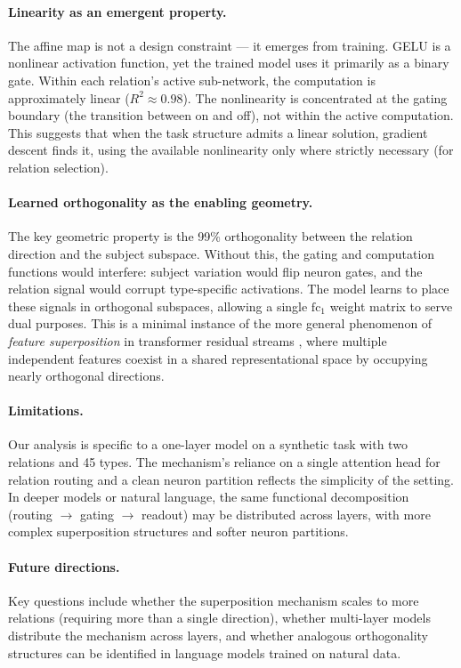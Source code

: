 \documentclass[11pt,a4paper]{article}
\newcommand{\fc}{\mathrm{fc}}
\begin{document}
\paragraph{Linearity as an emergent property.}
The affine map is not a design constraint --- it emerges from
training. GELU is a nonlinear activation function, yet the trained
model uses it primarily as a binary gate. Within each relation's
active sub-network, the computation is approximately linear ($R^2
\approx 0.98$). The nonlinearity is concentrated at the gating
boundary (the transition between on and off), not within the active
computation. This suggests that when the task structure admits a
linear solution, gradient descent finds it, using the available
nonlinearity only where strictly necessary (for relation selection).

\paragraph{Learned orthogonality as the enabling geometry.}
The key geometric property is the 99\% orthogonality between the
relation direction and the subject subspace. Without this, the
gating and computation functions would interfere: subject variation
would flip neuron gates, and the relation signal would corrupt
type-specific activations. The model learns to place these signals
in orthogonal subspaces, allowing a single $\fc_1$ weight matrix to
serve dual purposes. This is a minimal instance of the more general
phenomenon of \emph{feature superposition} in transformer residual
streams \citep{elhage2022superposition}, where multiple independent
features coexist in a shared representational space by occupying
nearly orthogonal directions.

\paragraph{Limitations.}
Our analysis is specific to a one-layer model on a synthetic task
with two relations and 45 types. The mechanism's reliance on a single
attention head for relation routing and a clean neuron partition
reflects the simplicity of the setting. In deeper models or natural
language, the same functional decomposition (routing $\to$ gating
$\to$ readout) may be distributed across layers, with more complex
superposition structures and softer neuron partitions.

\paragraph{Future directions.}
Key questions include whether the superposition mechanism scales to
more relations (requiring more than a single direction), whether
multi-layer models distribute the mechanism across layers, and whether
analogous orthogonality structures can be identified in language
models trained on natural data.
\end{document}
